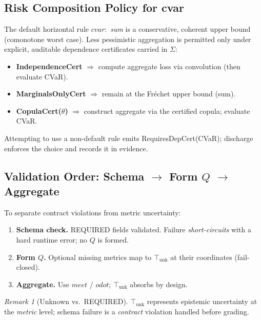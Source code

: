 \documentclass[11pt]{article}
\theoremstyle{plain}
\theoremstyle{definition}
\theoremstyle{remark}
\newtheorem{remark}[theorem]{Remark}
\def\Q{Q}%
\def\Sig{\Sigma}%
\def\vmeet{meet}%
\def\hplus{odot}%
\def\code#1{#1}%
\DeclareRobustCommand{\Q}{\texorpdfstring{\ensuremath{\mathcal{Q}}}{Q}}     %
\DeclareRobustCommand{\Sig}{\texorpdfstring{\ensuremath{\Sigma}}{\Sigma}}   %
\newcommand{\unk}{\top_{\mathrm{unk}}}         %
\newcommand{\vmeet}{\wedge}                    %
\newcommand{\hplus}{\odot}                     %
\newcommand{\code}[1]{\texttt{\textup{#1}}}    %
\newcommand{\cvar}{\code{cvar}}
\def\Q{Q}%
\def\Sig{\Sigma}%
\def\vmeet{meet}%
\def\hplus{odot}%
\def\code#1{#1}%
\begin{document}
\subsection{Risk Composition Policy for \texorpdfstring{\cvar}{cvar}}
The default horizontal rule $\cvar{:}$ \emph{sum} is a conservative, coherent upper bound (comonotone worst case). Less pessimistic aggregation is permitted only under explicit, auditable dependence certificates carried in $\Sig$:
\begin{itemize}[leftmargin=1.6em]
  \item \textbf{IndependenceCert} $\Rightarrow$ compute aggregate loss via convolution (then evaluate CVaR).
  \item \textbf{MarginalsOnlyCert} $\Rightarrow$ remain at the Fréchet upper bound (sum).
  \item \textbf{CopulaCert($\theta$)} $\Rightarrow$ construct aggregate via the certified copula; evaluate CVaR.
\end{itemize}
Attempting to use a non-default rule emits \code{RequiresDepCert(CVaR)}; \Sig{} discharge enforces the choice and records it in evidence.

\subsection{Validation Order: Schema \texorpdfstring{$\to$}{->} Form \texorpdfstring{$\Q$}{Q} \texorpdfstring{$\to$}{->} Aggregate}
To separate contract violations from metric uncertainty:
\begin{enumerate}[leftmargin=2em,label=(V\arabic*)]
  \item \textbf{Schema check.} REQUIRED fields validated. Failure \emph{short-circuits} with a hard runtime error; no $\Q$ is formed.
  \item \textbf{Form $\Q$.} Optional missing metrics map to $\unk$ at their coordinates (fail-closed).
  \item \textbf{Aggregate.} Use $\vmeet$ / $\hplus$; $\unk$ absorbs by design.
\end{enumerate}
\begin{remark}[Unknown vs.\ REQUIRED]
$\unk$ represents epistemic uncertainty at the \emph{metric} level; schema failure is a \emph{contract} violation handled before grading.
\end{remark}
\end{document}

